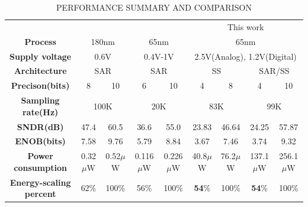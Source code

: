 \begin{table}[htbp]
	\caption{PERFORMANCE SUMMARY AND COMPARISON}
	\begin{center}
		\begin{tabular}{|c|c|c|c|c|c|c|c|c|}
			\hline
			\textbf{}& \multicolumn{2}{|c|}{\cite{zhu_06_2013}} & \multicolumn{2}{|c|}{\cite{yip_resolution-reconfigurable_2013}} & \multicolumn{4}{|c|}{This work} \\
			\hhline{|=========|}
			\textbf{Process}& \multicolumn{2}{|c|}{180nm} & \multicolumn{2}{|c|}{65nm} & \multicolumn{4}{|c|}{65nm} \\
			\hline 
			\textbf{Supply voltage}& \multicolumn{2}{|c|}{0.6V} & \multicolumn{2}{|c|}{0.4V-1V} & \multicolumn{4}{|c|}{2.5V(Analog), 1.2V(Digital)} \\
			\hline
			
			\textbf{Architecture}& \multicolumn{2}{|c|}{SAR} & \multicolumn{2}{|c|}{SAR} & \multicolumn{2}{|c|}{SS} & \multicolumn{2}{|c|}{SAR/SS}\\
			\hline
			\textbf{Precison(bits)} & 8 & 10 & 6 & 10 & 4 & 8 & 4 & 10 \\
			\hline
			\textbf{Sampling rate(Hz)}& \multicolumn{2}{|c|}{100K} & \multicolumn{2}{|c|}{20K} & \multicolumn{2}{|c|}{83K} & \multicolumn{2}{|c|}{99K} \\
			\hline
			\textbf{SNDR(dB)} & 47.4 & 60.5 & 36.6 & 55.0 & 23.83 & 46.64 & 24.25 & 57.87 \\
			\hline
			\textbf{ENOB(bits)}& 7.58 & 9.76 & 5.79 & 8.84 & 3.67 & 7.46 & 3.74 & 9.32 \\
			\hline
			\textbf{Power consumption}& 0.32$\mu$W & 0.52$\mu$W &  0.116$\mu$W & 0.226$\mu$W & 40.8$\mu$W & 76.2$\mu$W & 137.1$\mu$W & 256.1$\mu$W\\
			\hline
			\textbf{Energy-scaling percent}& 62\% & 100\% & 56\% & 100\% & \textbf{54}\% & 100\% & \textbf{54}\% & 100\% \\
			\hline
		\end{tabular}
		\label{tab1}
	\end{center}
\end{table}

